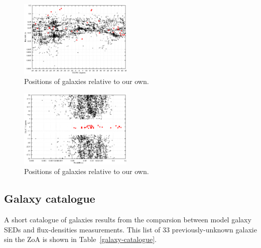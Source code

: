\documentclass[times,usenatbib]{mn2e}
\begin{document}
\begin{figure}
\includegraphics[width=0.48\textwidth]{./figures/2MRS_zlon.eps}
\caption{Positions of galaxies relative to our own.}
\label{2mrsz}
\end{figure}

\begin{figure}
\includegraphics[width=0.48\textwidth]{./figures/2MRS_zlat.eps}
\caption{Positions of galaxies relative to our own.}
\label{2mrsz2}
\end{figure}

\subsection{Galaxy catalogue}

A short catalogue of galaxies results from the comparsion between model galaxy SEDs and flux-densities measurements. This list of 33 previously-unknown galaxie sin the ZoA is shown in Table~\ref{galaxy-catalogue}. 
\end{document}
